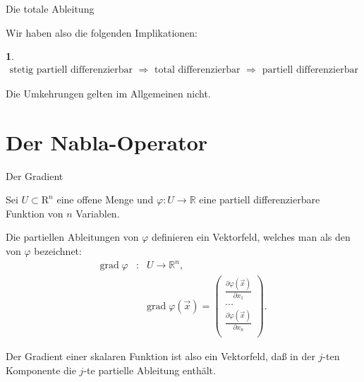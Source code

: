 \documentclass[german]{beamer}
\newcommand{\bq}{\begin{eqnarray*}}
\newcommand{\eq}{\end{eqnarray*}}
\newcommand{\superalert}[1]{{\color{MyYellowOrange}{#1}}}
\newtheorem*{myemptytheorem}{}
\begin{document}
\begin{frame}{Die totale Ableitung}

Wir haben also die folgenden Implikationen:
\begin{myemptytheorem}
{\footnotesize
\bq
 \mbox{stetig partiell differenzierbar }
 \Rightarrow 
 \mbox{ total differenzierbar }
 \Rightarrow
 \mbox{ partiell differenzierbar}
\eq
}
\end{myemptytheorem}

\vspace*{2mm}
Die Umkehrungen gelten im Allgemeinen nicht.

\end{frame}


\section{Der Nabla-Operator}

\frame{\sectionpage}

\begin{frame}{Der Gradient}

Sei $U \subset {\mathrm R}^n$ eine offene Menge und 
$\varphi : U \rightarrow {\mathbb R}$ eine partiell differenzierbare
Funktion von $n$ Variablen.

\begin{definition}
Die partiellen Ableitungen von $\varphi$ definieren ein Vektorfeld, 
welches man als den \superalert{Gradienten} von $\varphi$ bezeichnet:
\bq
 \mbox{grad} \; \varphi & : & U \rightarrow {\mathbb R}^n, 
 \nonumber \\
 & & \mbox{grad} \; \varphi\left(\vec{x}\right)
     = \left( \begin{array}{c}
              \frac{\partial \varphi\left(\vec{x}\right)}{\partial x_1} \\
              ... \\
              \frac{\partial \varphi\left(\vec{x}\right)}{\partial x_n} \\
              \end{array}
       \right).
\eq
\end{definition}
Der Gradient einer skalaren Funktion ist also ein Vektorfeld, da{\ss} in der $j$-ten Komponente die 
$j$-te partielle Ableitung enth\"alt.

\end{frame}
\end{document}
